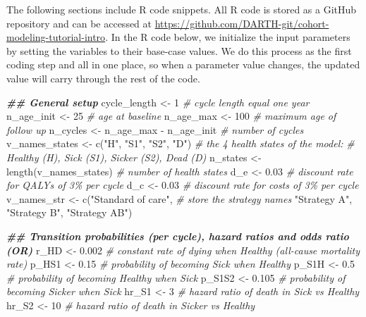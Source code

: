 \documentclass[
]{article}
\newenvironment{Shaded}{\begin{snugshade}}{\end{snugshade}}
\newcommand{\CommentTok}[1]{\textcolor[rgb]{0.56,0.35,0.01}{\textit{#1}}}
\newcommand{\DecValTok}[1]{\textcolor[rgb]{0.00,0.00,0.81}{#1}}
\newcommand{\DocumentationTok}[1]{\textcolor[rgb]{0.56,0.35,0.01}{\textbf{\textit{#1}}}}
\newcommand{\FloatTok}[1]{\textcolor[rgb]{0.00,0.00,0.81}{#1}}
\newcommand{\FunctionTok}[1]{\textcolor[rgb]{0.00,0.00,0.00}{#1}}
\newcommand{\NormalTok}[1]{#1}
\newcommand{\OtherTok}[1]{\textcolor[rgb]{0.56,0.35,0.01}{#1}}
\newcommand{\SpecialCharTok}[1]{\textcolor[rgb]{0.00,0.00,0.00}{#1}}
\newcommand{\StringTok}[1]{\textcolor[rgb]{0.31,0.60,0.02}{#1}}
\begin{document}
The following sections include R code snippets. All R code is stored as a GitHub repository and can be accessed at \url{https://github.com/DARTH-git/cohort-modeling-tutorial-intro}. In the R code below, we initialize the input parameters by setting the variables to their base-case values. We do this process as the first coding step and all in one place, so when a parameter value changes, the updated value will carry through the rest of the code.

\begin{Shaded}
\begin{Highlighting}[]
\DocumentationTok{\#\# General setup}
\NormalTok{cycle\_length }\OtherTok{\textless{}{-}} \DecValTok{1} \CommentTok{\# cycle length equal one year}
\NormalTok{n\_age\_init }\OtherTok{\textless{}{-}} \DecValTok{25}  \CommentTok{\# age at baseline}
\NormalTok{n\_age\_max  }\OtherTok{\textless{}{-}} \DecValTok{100} \CommentTok{\# maximum age of follow up}
\NormalTok{n\_cycles }\OtherTok{\textless{}{-}}\NormalTok{ n\_age\_max }\SpecialCharTok{{-}}\NormalTok{ n\_age\_init }\CommentTok{\# number of cycles}
\NormalTok{v\_names\_states }\OtherTok{\textless{}{-}} \FunctionTok{c}\NormalTok{(}\StringTok{"H"}\NormalTok{, }\StringTok{"S1"}\NormalTok{, }\StringTok{"S2"}\NormalTok{, }\StringTok{"D"}\NormalTok{) }\CommentTok{\# the 4 health states of the model:}
                               \CommentTok{\# Healthy (H), Sick (S1), Sicker (S2), Dead (D)}
\NormalTok{n\_states }\OtherTok{\textless{}{-}} \FunctionTok{length}\NormalTok{(v\_names\_states) }\CommentTok{\# number of health states }
\NormalTok{d\_e }\OtherTok{\textless{}{-}} \FloatTok{0.03} \CommentTok{\# discount rate for QALYs of 3\% per cycle }
\NormalTok{d\_c }\OtherTok{\textless{}{-}} \FloatTok{0.03} \CommentTok{\# discount rate for costs of 3\% per cycle }
\NormalTok{v\_names\_str }\OtherTok{\textless{}{-}} \FunctionTok{c}\NormalTok{(}\StringTok{"Standard of care"}\NormalTok{, }\CommentTok{\# store the strategy names}
                 \StringTok{"Strategy A"}\NormalTok{, }
                 \StringTok{"Strategy B"}\NormalTok{,}
                 \StringTok{"Strategy AB"}\NormalTok{) }

\DocumentationTok{\#\# Transition probabilities (per cycle), hazard ratios and odds ratio (OR)}
\NormalTok{r\_HD    }\OtherTok{\textless{}{-}} \FloatTok{0.002} \CommentTok{\# constant rate of dying when Healthy (all{-}cause mortality rate)}
\NormalTok{p\_HS1   }\OtherTok{\textless{}{-}} \FloatTok{0.15}  \CommentTok{\# probability of becoming Sick when Healthy}
\NormalTok{p\_S1H   }\OtherTok{\textless{}{-}} \FloatTok{0.5}   \CommentTok{\# probability of becoming Healthy when Sick}
\NormalTok{p\_S1S2  }\OtherTok{\textless{}{-}} \FloatTok{0.105} \CommentTok{\# probability of becoming Sicker when Sick}
\NormalTok{hr\_S1   }\OtherTok{\textless{}{-}} \DecValTok{3}     \CommentTok{\# hazard ratio of death in Sick vs Healthy}
\NormalTok{hr\_S2   }\OtherTok{\textless{}{-}} \DecValTok{10}    \CommentTok{\# hazard ratio of death in Sicker vs Healthy }


\end{Highlighting}
\end{Shaded}
\end{document}
